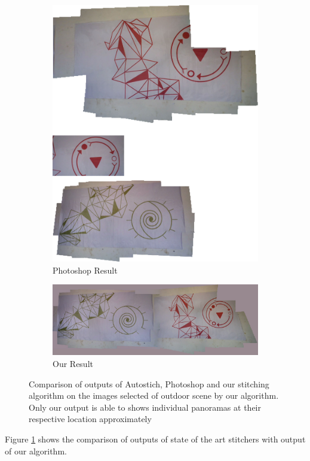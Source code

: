 \begin{figure}
\begin{subfigure}[b]{0.3\textwidth}
\includegraphics[width=\linewidth]{figures/green_red/photoshop_output.jpg}
\caption{Photoshop Result}
\end{subfigure}
\begin{subfigure}[b]{0.3\textwidth}
\includegraphics[width=\linewidth]{figures/green_red/our_result.jpg}
\caption{Our Result}
\end{subfigure}
\caption{Comparison of outputs of Autostich, Photoshop and our stitching
algorithm on the images selected of outdoor scene by our algorithm. Only our
output is able to shows individual panoramas at their respective location
approximately}
\label{fig:green_red_comparison}
\end{figure}

Figure \ref{fig:green_red_comparison} shows the comparison of outputs of
state of the art stitchers with output of our algorithm.